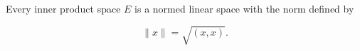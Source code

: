 Every inner product space $E$ is a normed linear space with the norm defined by

$$\|x\| = \sqrt{(x, x)}.$$
